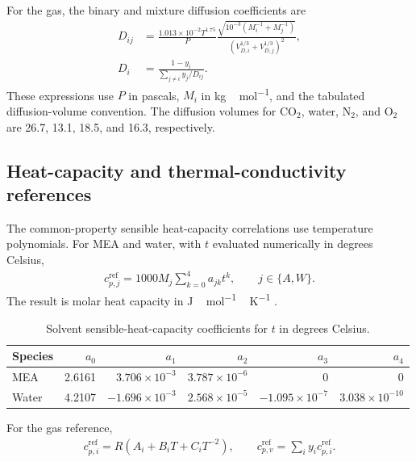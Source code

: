 For the gas, the binary and mixture diffusion coefficients are
\begin{align}
D_{ij}&=\frac{1.013\times10^{-2}T^{1.75}}{P}
\frac{\sqrt{10^{-3}(M_i^{-1}+M_j^{-1})}}
{(V_{D,i}^{1/3}+V_{D,j}^{1/3})^2},\\
D_i&=\frac{1-y_i}{\sum_{j\ne i}y_j/D_{ij}}.
\end{align}
These expressions use $P$ in pascals, $M_i$ in \unit{kg\,mol^{-1}}, and the tabulated diffusion-volume convention.
The diffusion volumes for CO$_2$, water, N$_2$, and O$_2$ are 26.7, 13.1, 18.5, and 16.3, respectively.

\subsection{Heat-capacity and thermal-conductivity references}
The common-property sensible heat-capacity correlations use temperature polynomials.
For MEA and water, with $t$ evaluated numerically in degrees Celsius,
\begin{align}
c_{p,j}^{\mathrm{ref}}=1000M_j\sum_{k=0}^{4}a_{jk}t^k,
\qquad j\in\{A,W\}.
\end{align}
The result is molar heat capacity in \unit{J\,mol^{-1}\,K^{-1}} \cite{Hilliard2008}.

\begin{table}[pos=htbp]
\centering\small
\caption{Solvent sensible-heat-capacity coefficients for $t$ in degrees Celsius.}
\label{tab:solvent-cp-coefficients}
\begin{tabular}{@{}lrrrrr@{}}
\toprule
Species & $a_0$ & $a_1$ & $a_2$ & $a_3$ & $a_4$\\
\midrule
MEA & 2.6161 & $3.706\times10^{-3}$ & $3.787\times10^{-6}$ & 0 & 0\\
Water & 4.2107 & $-1.696\times10^{-3}$ & $2.568\times10^{-5}$ & $-1.095\times10^{-7}$ & $3.038\times10^{-10}$\\
\bottomrule
\end{tabular}
\end{table}

For the gas reference,
\begin{align}
c_{p,i}^{\mathrm{ref}}=R(A_i+B_iT+C_iT^{-2}),\qquad
c_{p,v}^{\mathrm{ref}}=\sum_i y_i c_{p,i}^{\mathrm{ref}}.
\end{align}

